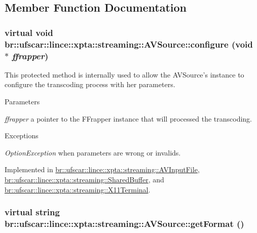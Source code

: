\subsection{Member Function Documentation}
\hypertarget{classbr_1_1ufscar_1_1lince_1_1xpta_1_1streaming_1_1AVSource_a35f8e70290dafd5ad952f54c3bc44ce3}{
\subsubsection[{configure}]{\setlength{\rightskip}{0pt plus 5cm}virtual void br::ufscar::lince::xpta::streaming::AVSource::configure (void $\ast$ {\em ffrapper})}}
\label{classbr_1_1ufscar_1_1lince_1_1xpta_1_1streaming_1_1AVSource_a35f8e70290dafd5ad952f54c3bc44ce3}


This protected method is internally used to allow the AVSource's instance to configure the transcoding process with her parameters. 


\begin{DoxyParams}{Parameters}
\item[{\em ffrapper}]a pointer to the FFrapper instance that will processed the transcoding. \end{DoxyParams}

\begin{DoxyExceptions}{Exceptions}
\item[{\em OptionException}]when parameters are wrong or invalids. \end{DoxyExceptions}


Implemented in \hyperlink{classbr_1_1ufscar_1_1lince_1_1xpta_1_1streaming_1_1AVInputFile_afee89583e6231825a2282b9bb9860c07}{br::ufscar::lince::xpta::streaming::AVInputFile}, \hyperlink{classbr_1_1ufscar_1_1lince_1_1xpta_1_1streaming_1_1SharedBuffer_af6606fe080919c0152ab9c844a82e40f}{br::ufscar::lince::xpta::streaming::SharedBuffer}, and \hyperlink{classbr_1_1ufscar_1_1lince_1_1xpta_1_1streaming_1_1X11Terminal_af41a852e18a8d9fa64202eb12f2dfb12}{br::ufscar::lince::xpta::streaming::X11Terminal}.

\hypertarget{classbr_1_1ufscar_1_1lince_1_1xpta_1_1streaming_1_1AVSource_af48c984168363d2f473f8468b1abdece}{
\subsubsection[{getFormat}]{\setlength{\rightskip}{0pt plus 5cm}virtual string br::ufscar::lince::xpta::streaming::AVSource::getFormat ()}}
\label{classbr_1_1ufscar_1_1lince_1_1xpta_1_1streaming_1_1AVSource_af48c984168363d2f473f8468b1abdece}


